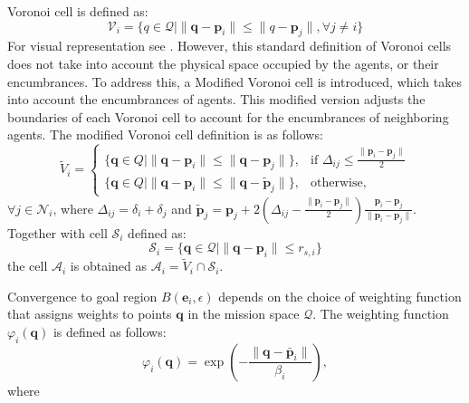        Voronoi cell is defined as: 
        \begin{equation}
            \mathcal{V}_i = \{q \in \mathcal{Q} \lvert \lVert \mathbf{q} - \mathbf{p}_i \rVert \leq \lVert q - \mathbf{p}_j \rVert, \forall j \neq i\}
        \end{equation}
        For visual representation see . 
        However, this standard definition of Voronoi cells does not take into account the physical space occupied by the agents, or their encumbrances. 
        To address this, a Modified Voronoi cell is introduced, which takes into account the encumbrances of agents.
        This modified version adjusts the boundaries of each Voronoi cell to account for the encumbrances of neighboring agents.
        The modified Voronoi cell definition is as follows:
        \begin{equation}
            \tilde{V}_i = 
            \begin{cases}
            \{ \mathbf{q} \in Q \mid \| \mathbf{q} - \mathbf{p}_i \| \leq \| \mathbf{q} - \mathbf{p}_j \| \}, & \text{if } \Delta_{ij} \leq \frac{\| \mathbf{p}_i - \mathbf{p}_j \|}{2} \\
            \{ \mathbf{q} \in Q \mid \| \mathbf{q} - \mathbf{p}_i \| \leq \| \mathbf{q} - \tilde{\mathbf{p}}_j \| \}, & \text{otherwise},
            \end{cases}
        \end{equation}
        $\forall j \in \mathcal{N}_i$, where $\Delta_{ij} = \delta_i + \delta_j$ and $\tilde{\mathbf{p}}_j = \mathbf{p}_j + 2(\Delta_{ij} - \frac{\| \mathbf{p}_i - \mathbf{p}_j \|}{2})\frac{ \mathbf{p}_i - \mathbf{p}_j }{\| \mathbf{p}_i - \mathbf{p}_j \|}$.
        Together with cell $\mathcal{S}_i$ defined as: 
        \begin{equation}
            \mathcal{S}_i = \{\mathbf{q} \in \mathcal{Q} | \| \mathbf{q} - \mathbf{p}_i \| \leq r_{s,i}\}
        \end{equation}
        the cell $\mathcal{A}_i$ is obtained as $\mathcal{A}_i = \tilde{V}_i \cap \mathcal{S}_i$.

        Convergence to goal region $B(\mathbf{e}_i, \epsilon)$ depends on the choice of weighting function that assigns weights to points $\mathbf{q}$ in the mission space $\mathcal{Q}$.
        The weighting function $\varphi_i(\mathbf{q})$ is defined as follows: 
        \begin{equation}
            \varphi_i(\mathbf{q}) = \exp\left(-\frac{\|\mathbf{q} - \mathbf{\bar{p}}_i\|}{\beta_i}\right),
        \end{equation}
        where 
        
